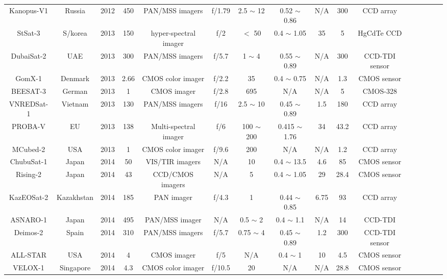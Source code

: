 \documentclass[final,5p,times,sort&compress,twocolumn]{elsarticle}
\begin{document}
\begin{table}
{\begin{tabular}{c c c c c c c c c c c c c c c c}
		    Kanopus-V1 & Russia & 2012 & 450 & PAN/MSS imagers & f/1.79 & 2.5 $\sim$ 12 & 0.52 $\sim$ 0.86 & N/A & 300 &CCD array & \cite{eoportal}\\	
		    StSat-3 & S/korea & 2013 & 150 & hyper-spectral imager & f/2 & $<$ 50 & 0.4 $\sim$ 1.05 & 35 & 5 & HgCdTe CCD & \cite{lee2007compact}\\	
		    DubaiSat-2 & UAE & 2013 & 300 & PAN/MSS imagers & f/5.7 & 1 $\sim$ 4 & 0.55 $\sim$ 0.89 & N/A & 300 &  CCD-TDI sensor & \cite{bushahab2014cal}\\
		    GomX-1 & Denmark & 2013 & 2.66 & CMOS color imager & f/2.2 & 35 & 0.4 $\sim$ 0.75 &  N/A &  1.3 & CMOS sensor & \cite{gomspace2023}\\		 
		    BEESAT-3 & German & 2013 & 1 & CMOS imager & f/2.8 & 695 & N/A &  N/A & 5 & CMOS-328 & \cite{eoportal}\\		    
		    VNREDSat-1 & Vietnam & 2013 & 130 & PAN/MSS imagers & f/16 & 2.5 $\sim$ 10 & 0.45 $\sim$ 0.89 &1.5 & 180 & CCD array & \cite{eoportal}\\	
		    PROBA-V & EU & 2013 & 138 & Multi-spectral imager & f/6 & 100 $\sim$ 200 & 0.415 $\sim$ 1.76 &  34 & 43.2 &  CCD array & \cite{eoportal}\\		    
		    MCubed-2 & USA & 2013 & 1 & CMOS color imager & f/9.6 & 200 & N/A & N/A & 1.2 &  CCD array & \cite{bekker2010cubesat}\\		   
		    ChubuSat-1 & Japan & 2014 & 50 & VIS/TIR imagers & N/A & 10 & 0.4 $\sim$ 13.5 &  4.6 & 85 &  CMOS sensor & \cite{ Narusawa2012DEVELOPMENTOC}\\		
		    Rising-2 & Japan & 2014 & 43 & CCD/CMOS imagers & N/A & 5 & 0.4 $\sim$ 1.05 &  29 & 28.4 &CMOS sensor & \cite{sakamoto2010development}\\		    
		    KazEOSat-2 & Kazakhstan & 2014 & 185 & PAN imager & f/4.3 & 1 & 0.44 $\sim$ 0.85 & 6.75 & 93 &  CCD array & \cite{kurczynski2016possibilities} \\		 
		    ASNARO-1 & Japan & 2014 & 495 & PAN/MSS imager & N/A & 0.5 $\sim$ 2 & 0.4 $\sim$ 1.1 & N/A & 14 &  CCD-TDI & \cite{eoportal}\\		
		    Deimos-2 & Spain & 2014 & 310 & PAN/MSS imagers & f/5.7 & 0.75 $\sim$ 4 & 0.45 $\sim$ 0.89 &  1.2 & 300 &  CCD-TDI sensor & \cite{ pirondini2014deimos}\\		
		    ALL-STAR & USA & 2014 & 4 & CMOS imager & f/5 & N/A & 0.4 $\sim$ 1 &  10 & 4.5 &  CMOS sensor & \cite{eoportal}\\		 
		    VELOX-1 & Singapore & 2014 & 4.3 & CMOS color imager & f/10.5 & 20 & N/A & N/A & 28.8 &  CMOS sensor & \cite{bui2015system}\\		  

\end{tabular}}
\end{table}
\end{document}
